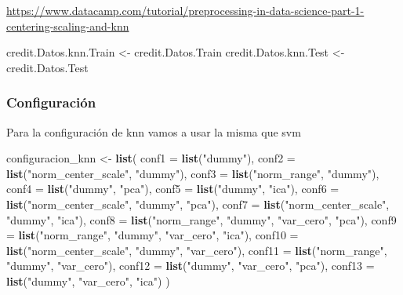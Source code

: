 \documentclass[
]{article}
\newenvironment{Shaded}{\begin{snugshade}}{\end{snugshade}}
\newcommand{\AttributeTok}[1]{\textcolor[rgb]{0.13,0.29,0.53}{#1}}
\newcommand{\FunctionTok}[1]{\textcolor[rgb]{0.13,0.29,0.53}{\textbf{#1}}}
\newcommand{\NormalTok}[1]{#1}
\newcommand{\OtherTok}[1]{\textcolor[rgb]{0.56,0.35,0.01}{#1}}
\newcommand{\StringTok}[1]{\textcolor[rgb]{0.31,0.60,0.02}{#1}}
\begin{document}
\url{https://www.datacamp.com/tutorial/preprocessing-in-data-science-part-1-centering-scaling-and-knn}

\begin{Shaded}
\begin{Highlighting}[]
\NormalTok{credit.Datos.knn.Train }\OtherTok{\textless{}{-}}\NormalTok{ credit.Datos.Train}
\NormalTok{credit.Datos.knn.Test }\OtherTok{\textless{}{-}}\NormalTok{ credit.Datos.Test}
\end{Highlighting}
\end{Shaded}

\hypertarget{configuraciuxf3n-2}{%
\subsubsection{Configuración}\label{configuraciuxf3n-2}}

Para la configuración de knn vamos a usar la misma que svm

\begin{Shaded}
\begin{Highlighting}[]
\NormalTok{configuracion\_knn }\OtherTok{\textless{}{-}} \FunctionTok{list}\NormalTok{(}
  \AttributeTok{conf1  =} \FunctionTok{list}\NormalTok{(}\StringTok{"dummy"}\NormalTok{),}
  \AttributeTok{conf2  =} \FunctionTok{list}\NormalTok{(}\StringTok{"norm\_center\_scale"}\NormalTok{, }\StringTok{"dummy"}\NormalTok{),}
  \AttributeTok{conf3  =} \FunctionTok{list}\NormalTok{(}\StringTok{"norm\_range"}\NormalTok{, }\StringTok{"dummy"}\NormalTok{),}
  \AttributeTok{conf4  =} \FunctionTok{list}\NormalTok{(}\StringTok{"dummy"}\NormalTok{, }\StringTok{"pca"}\NormalTok{),}
  \AttributeTok{conf5  =} \FunctionTok{list}\NormalTok{(}\StringTok{"dummy"}\NormalTok{, }\StringTok{"ica"}\NormalTok{),}
  \AttributeTok{conf6  =} \FunctionTok{list}\NormalTok{(}\StringTok{"norm\_center\_scale"}\NormalTok{, }\StringTok{"dummy"}\NormalTok{, }\StringTok{"pca"}\NormalTok{),}
  \AttributeTok{conf7  =} \FunctionTok{list}\NormalTok{(}\StringTok{"norm\_center\_scale"}\NormalTok{, }\StringTok{"dummy"}\NormalTok{, }\StringTok{"ica"}\NormalTok{),}
  \AttributeTok{conf8  =} \FunctionTok{list}\NormalTok{(}\StringTok{"norm\_range"}\NormalTok{, }\StringTok{"dummy"}\NormalTok{, }\StringTok{"var\_cero"}\NormalTok{, }\StringTok{"pca"}\NormalTok{),}
  \AttributeTok{conf9  =} \FunctionTok{list}\NormalTok{(}\StringTok{"norm\_range"}\NormalTok{, }\StringTok{"dummy"}\NormalTok{, }\StringTok{"var\_cero"}\NormalTok{, }\StringTok{"ica"}\NormalTok{),}
  \AttributeTok{conf10 =} \FunctionTok{list}\NormalTok{(}\StringTok{"norm\_center\_scale"}\NormalTok{, }\StringTok{"dummy"}\NormalTok{, }\StringTok{"var\_cero"}\NormalTok{),}
  \AttributeTok{conf11 =} \FunctionTok{list}\NormalTok{(}\StringTok{"norm\_range"}\NormalTok{, }\StringTok{"dummy"}\NormalTok{, }\StringTok{"var\_cero"}\NormalTok{),}
  \AttributeTok{conf12 =} \FunctionTok{list}\NormalTok{(}\StringTok{"dummy"}\NormalTok{, }\StringTok{"var\_cero"}\NormalTok{, }\StringTok{"pca"}\NormalTok{),}
  \AttributeTok{conf13 =} \FunctionTok{list}\NormalTok{(}\StringTok{"dummy"}\NormalTok{, }\StringTok{"var\_cero"}\NormalTok{, }\StringTok{"ica"}\NormalTok{)}
\NormalTok{)}
\end{Highlighting}
\end{Shaded}
\end{document}
